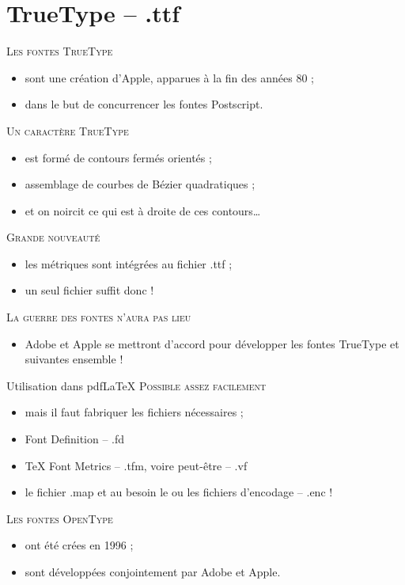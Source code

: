 \documentclass[12pt,a4paper,twocolumn]{book} %
\begin{document}
{                  \section{TrueType -- .ttf}
	                  {\textsc{Les fontes TrueType}}
		          \begin{itemize}
			  \item sont une création d'Apple, apparues à la fin des années 80 ;
			  \item dans le but de concurrencer les fontes Postscript.
		          \end{itemize}
	                      {\textsc{Un caractère TrueType}}
		              \begin{itemize}
			      \item est formé de contours fermés orientés ;
			      \item assemblage de courbes de Bézier quadratiques ;
			      \item et on noircit ce qui est à droite de ces contours\dots
		              \end{itemize}
                                  {\textsc{Grande nouveauté}}
		                  \begin{itemize}
			          \item les métriques sont intégrées au fichier .ttf ;
			          \item un seul fichier suffit donc !
		                  \end{itemize}
                                      {\textsc{La guerre des fontes n'aura pas lieu}}
		                      \begin{itemize}
			              \item Adobe et Apple se mettront d'accord pour développer les fontes TrueType et suivantes ensemble !
		                      \end{itemize}


                                      Utilisation dans pdf\LaTeX
                                      {\textsc{Possible assez facilement}}
		                      \begin{itemize}
			              \item mais il faut fabriquer les fichiers nécessaires ;
			              \item Font Definition -- .fd
			              \item TeX Font Metrics -- .tfm, voire peut-être -- .vf
			              \item le fichier .map et au besoin le ou les fichiers d'encodage -- .enc !
		                      \end{itemize}
                                          {\textsc{Les fontes OpenType}}
		                          \begin{itemize}
			                  \item ont été crées en 1996 ;
			                  \item sont développées conjointement par Adobe et Apple.
		                          \end{itemize}

}
\end{document}

